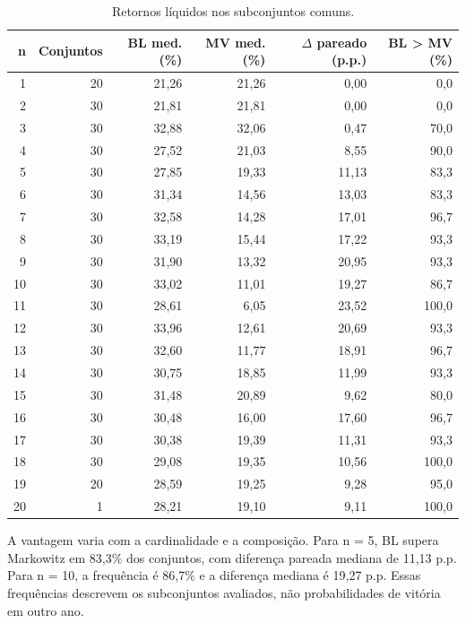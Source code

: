 \begin{table}[H]
\centering
\caption{Retornos líquidos nos subconjuntos comuns.}
{\footnotesize
\begin{tabular}{@{}rrrrrr@{}}
\hline
n & Conjuntos & BL med. (\%) & MV med. (\%) & $\Delta$ pareado (p.p.) & BL > MV (\%) \\ \hline
1 & 20 & 21,26 & 21,26 & 0,00 & 0,0 \\
2 & 30 & 21,81 & 21,81 & 0,00 & 0,0 \\
3 & 30 & 32,88 & 32,06 & 0,47 & 70,0 \\
4 & 30 & 27,52 & 21,03 & 8,55 & 90,0 \\
5 & 30 & 27,85 & 19,33 & 11,13 & 83,3 \\
6 & 30 & 31,34 & 14,56 & 13,03 & 83,3 \\
7 & 30 & 32,58 & 14,28 & 17,01 & 96,7 \\
8 & 30 & 33,19 & 15,44 & 17,22 & 93,3 \\
9 & 30 & 31,90 & 13,32 & 20,95 & 93,3 \\
10 & 30 & 33,02 & 11,01 & 19,27 & 86,7 \\
11 & 30 & 28,61 & 6,05 & 23,52 & 100,0 \\
12 & 30 & 33,96 & 12,61 & 20,69 & 93,3 \\
13 & 30 & 32,60 & 11,77 & 18,91 & 96,7 \\
14 & 30 & 30,75 & 18,85 & 11,99 & 93,3 \\
15 & 30 & 31,48 & 20,89 & 9,62 & 80,0 \\
16 & 30 & 30,48 & 16,00 & 17,60 & 96,7 \\
17 & 30 & 30,38 & 19,39 & 11,31 & 93,3 \\
18 & 30 & 29,08 & 19,35 & 10,56 & 100,0 \\
19 & 20 & 28,59 & 19,25 & 9,28 & 95,0 \\
20 & 1 & 28,21 & 19,10 & 9,11 & 100,0 \\
\hline
\end{tabular}}
\par{}
\end{table}
A vantagem varia com a cardinalidade e a composição. Para n = 5, BL supera Markowitz em 83,3\% dos conjuntos, com diferença pareada mediana de 11,13 p.p. Para n = 10, a frequência é 86,7\% e a diferença mediana é 19,27 p.p. Essas frequências descrevem os subconjuntos avaliados, não probabilidades de vitória em outro ano.

